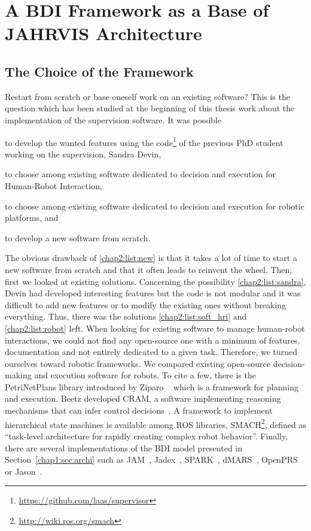 \documentclass[a4paper,11pt,twoside]{StyleThese}
\begin{document}
\section{A BDI Framework as a Base of JAHRVIS Architecture}\label{chap2:sec:bdi}


\subsection{The Choice of the Framework}
Restart from scratch or base oneself work on an existing software? This is the question which has been studied at the beginning of this thesis work about the implementation of the supervision software. It was possible 
\begin{inlineEnumerate}
	\item to develop the wanted features using the code\footnote{\url{https://github.com/laas/supervisor}} of the previous PhD student working on the supervision, Sandra Devin,\label{chap2:list:sandra}
	\item to choose among existing software dedicated to decision and execution for Human-Robot Interaction,\label{chap2:list:soft_hri}
	\item to choose among existing software dedicated to decision and execution for robotic platforms, and\label{chap2:list:robot}
	\item to develop a new software from scratch.\label{chap2:list:new}
\end{inlineEnumerate}

The obvious drawback of \ref{chap2:list:new} is that it takes a lot of time to start a new software from scratch and that it often leads to reinvent the wheel. Then, first we looked at existing solutions. Concerning the possibility \ref{chap2:list:sandra}, Devin had developed interesting features but the code is not modular and it was difficult to add new features or to modify the existing ones without breaking everything. Thus, there was the solutions \ref{chap2:list:soft_hri} and \ref{chap2:list:robot} left. When looking for existing software to manage human-robot interactions, we could not find any open-source one with a minimum of features, documentation and not entirely dedicated to a given task. Therefore, we turned ourselves toward robotic frameworks. We compared existing open-source decision-making and execution software for robots. To cite a few, there is the PetriNetPlans library introduced by Ziparo \etal~\cite{ziparo_2011_petri} which is a framework for planning and execution. Beetz \etal{} developed CRAM, a software implementing reasoning mechanisms that can infer control decisions~\cite{beetz_2010_cram}. A framework to implement hierarchical state machines is available among ROS libraries, SMACH\footnote{\url{http://wiki.ros.org/smach}}, defined as ``task-level architecture for rapidly creating complex robot behavior''. Finally, there are several implementations of the BDI model presented in Section~\ref{chap1:sec:archi} such as JAM~\cite{huber_1999_jam}, Jadex~\cite{braudach_2005_jadex}, SPARK~\cite{morley_2004_spark}, dMARS~\cite{dinverno_1998_formal}, OpenPRS~\cite{ingrand_1996_prs} or Jason~\cite{bordini_2007_jason}. 
\end{document}
